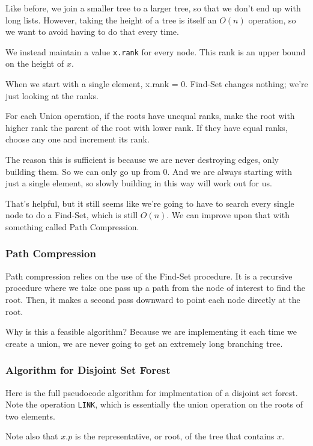 \documentclass[]{article}
\begin{document}
    Like before, we join a smaller tree to a larger tree, so that we don't end up with long lists. However, taking the height of a tree is itself an $O(n)$ operation, so we want to avoid having to do that every time. 

    We instead maintain a value \texttt{x.rank} for every node. This rank is an upper bound on the height of $x$. 

    When we start with a single element, x.rank = 0. Find-Set changes nothing; we're just looking at the ranks. 

    For each Union operation, if the roots have unequal ranks, make the root with higher rank the parent of the root with lower rank. If they have equal ranks, choose any one and increment its rank. 

    The reason this is sufficient is because we are never destroying edges, only building them. So we can only go up from 0. And we are always starting with just a single element, so slowly building in this way will work out for us. 

    That's helpful, but it still seems like we're going to have to search every single node to do a Find-Set, which is still $O(n)$. We can improve upon that with something called Path Compression. 

    \subsubsection*{Path Compression}

    Path compression relies on the use of the Find-Set procedure. It is a recursive procedure where we take one pass up a path from the node of interest to find the root. Then, it makes a second pass downward to point each node directly at the root. 

    Why is this a feasible algorithm? Because we are implementing it each time we create a union, we are never going to get an extremely long branching tree. 

    \subsubsection*{Algorithm for Disjoint Set Forest}

    Here is the full pseudocode algorithm for implmentation of a disjoint set forest. Note the operation \texttt{LINK}, which is essentially the union operation on the roots of two elements.

    Note also that $x.p$ is the representative, or root, of the tree that contains $x$.
\end{document}
